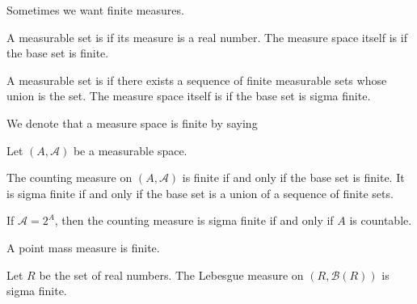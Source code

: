 
\sbasic



\sstart



Sometimes we want finite measures.


A measurable set is
if its measure is a real number.
The measure space itself is
if the base set is finite.

A measurable set is
if there exists a sequence of
finite measurable sets whose
union is the set.
The measure space itself is
if the base set is sigma finite.


We denote that a measure
space is finite by saying

\begin{expl}
Let $(A, \mathcal{A})$ be a measurable space.

The counting measure on $(A, \mathcal{A})$ is
finite if and only if the base set is finite.
It is sigma finite if and only if the base
set is a union of a sequence of finite sets.

If $\mathcal{A} = 2^A$, then the counting
measure is sigma finite if and only if
$A$ is countable.
\end{expl}

\begin{expl}
A point mass measure is finite.
\end{expl}

\begin{expl}
Let $R$ be the set of real numbers.
The Lebesgue measure on
$(R, \mathcal{B}(R))$ is sigma finite.
\end{expl}

\strats
